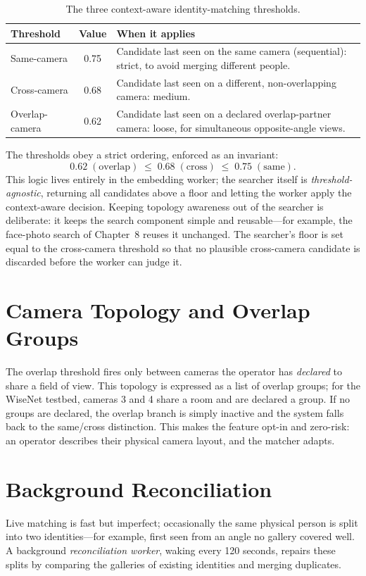 \documentclass[12pt]{report}
\begin{document}
\begin{table}[H]
\centering
\begin{tabularx}{\textwidth}{|l|c|X|}
\hline
\textbf{Threshold} & \textbf{Value} & \textbf{When it applies} \\
\hline
Same-camera & 0.75 & Candidate last seen on the same camera (sequential): strict, to avoid merging different people. \\
\hline
Cross-camera & 0.68 & Candidate last seen on a different, non-overlapping camera: medium. \\
\hline
Overlap-camera & 0.62 & Candidate last seen on a declared overlap-partner camera: loose, for simultaneous opposite-angle views. \\
\hline
\end{tabularx}
\caption{The three context-aware identity-matching thresholds.}
\label{tab:thresholds}
\end{table}

The thresholds obey a strict ordering, enforced as an invariant:
\[
0.62\;(\text{overlap}) \;\leq\; 0.68\;(\text{cross}) \;\leq\; 0.75\;(\text{same}).
\]
This logic lives entirely in the embedding worker; the searcher itself is \emph{threshold-agnostic}, returning all candidates above a floor and letting the worker apply the context-aware decision. Keeping topology awareness out of the searcher is deliberate: it keeps the search component simple and reusable---for example, the face-photo search of Chapter~8 reuses it unchanged. The searcher's floor is set equal to the cross-camera threshold so that no plausible cross-camera candidate is discarded before the worker can judge it.

\section{Camera Topology and Overlap Groups}
The overlap threshold fires only between cameras the operator has \emph{declared} to share a field of view. This topology is expressed as a list of overlap groups; for the WiseNet testbed, cameras 3 and 4 share a room and are declared a group. If no groups are declared, the overlap branch is simply inactive and the system falls back to the same/cross distinction. This makes the feature opt-in and zero-risk: an operator describes their physical camera layout, and the matcher adapts.

\section{Background Reconciliation}
Live matching is fast but imperfect; occasionally the same physical person is split into two identities---for example, first seen from an angle no gallery covered well. A background \emph{reconciliation worker}, waking every 120 seconds, repairs these splits by comparing the galleries of existing identities and merging duplicates.
\end{document}
